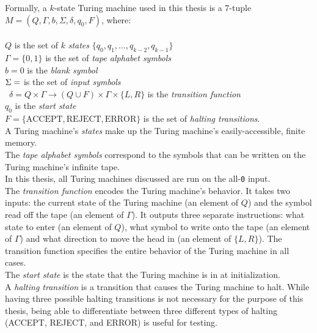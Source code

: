 Formally, a $k$-state Turing machine used in this thesis is a 7-tuple $M = (Q, \Gamma, b, \Sigma, \delta, q_0, F)$, where: \\ \\
$Q$ is the set of $k$ \emph{states} $\{q_0, q_1, \dots, q_{k-2}, q_{k-1}\}$ \\
$\Gamma = \{0, 1\}$ is the set of \emph{tape alphabet symbols} \\
$b = 0$ is the \emph{blank symbol} \\
$\Sigma = \empty$ is the set of \emph{input symbols} \\\
$\delta = Q \times \Gamma \rightarrow (Q \cup F) \times \Gamma \times \{L, R\}$ is the \emph{transition function} \\
$q_0$ is the \emph{start state} \\
$F = \{\textrm{ACCEPT}, \textrm{REJECT}, \textrm{ERROR}\}$ is the set of \emph{halting transitions}. \\

A Turing machine's \emph{states} make up the Turing machine's easily-accessible, finite memory. \\

The \emph{tape alphabet symbols} correspond to the symbols that can be written on the Turing machine's infinite tape. \\

In this thesis, all Turing machines discussed are run on the all-\texttt{0} input. \\

The \emph{transition function} encodes the Turing machine's behavior. It takes two inputs: the current state of the Turing machine (an element of $Q$) and the symbol read off the tape (an element of $\Gamma$). It outputs three separate instructions: what state to enter (an element of $Q$), what symbol to write onto the tape (an element of $\Gamma$) and what direction to move the head in (an element of $\{L, R\}$). The transition function specifies the entire behavior of the Turing machine in all cases. \\

The \emph{start state} is the state that the Turing machine is in at initialization. \\

A \emph{halting transition} is a transition that causes the Turing machine to halt. While having three possible halting transitions is not necessary for the purpose of this thesis, being able to differentiate between three different types of halting (ACCEPT, REJECT, and ERROR) is useful for testing.

